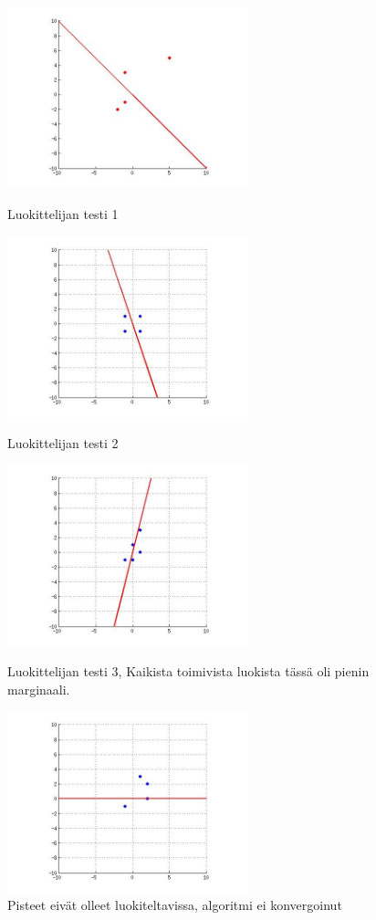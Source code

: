 \documentclass[a4paper,10pt]{article}
\begin{document}
\begin{figure}[ht!]

\includegraphics[width=70mm]{sanityCheck1.jpg}
\caption{Luokittelijan testi 1}


\includegraphics[width=70mm]{sanityCheck2.jpg}
\caption{Luokittelijan testi 2}

\includegraphics[width=70mm]{sanityCheck3.jpg}
\caption{Luokittelijan testi 3, Kaikista toimivista luokista tässä oli pienin marginaali.}

\includegraphics[width=70mm]{sanityCheck4.jpg}
\caption{Pisteet eivät olleet luokiteltavissa, algoritmi ei konvergoinut}

\label{overflow}
\end{figure}
\end{document}
